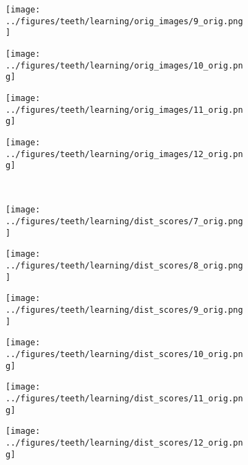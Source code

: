 \begin{figure}[h!]
\begin{subfigure}{0.16\textwidth}
		\label{fig:1}
	\end{subfigure}
	\begin{subfigure}{0.16\textwidth}
		\centering
		\texttt{[image: ../figures/teeth/learning/orig\_images/9\_orig.png]}
		\label{fig:1}
	\end{subfigure}
	\begin{subfigure}{0.16\textwidth}
		\centering
		\texttt{[image: ../figures/teeth/learning/orig\_images/10\_orig.png]}
		\label{fig:1}
	\end{subfigure}
	\begin{subfigure}{0.16\textwidth}
		\centering
		\texttt{[image: ../figures/teeth/learning/orig\_images/11\_orig.png]}
		\label{fig:1}
	\end{subfigure}
	\begin{subfigure}{0.16\textwidth}
		\centering
		\texttt{[image: ../figures/teeth/learning/orig\_images/12\_orig.png]}
		\label{fig:1}
	\end{subfigure}
	\vspace{-0.35cm}
	\\
	\begin{subfigure}{0.16\textwidth}
		\centering
		\texttt{[image: ../figures/teeth/learning/dist\_scores/7\_orig.png]}
		\label{fig:1}
	\end{subfigure}
	\begin{subfigure}{0.16\textwidth}
		\centering
		\texttt{[image: ../figures/teeth/learning/dist\_scores/8\_orig.png]}
		\label{fig:1}
	\end{subfigure}
	\begin{subfigure}{0.16\textwidth}
		\centering
		\texttt{[image: ../figures/teeth/learning/dist\_scores/9\_orig.png]}
		\label{fig:1}
	\end{subfigure}
	\begin{subfigure}{0.16\textwidth}
		\centering
		\texttt{[image: ../figures/teeth/learning/dist\_scores/10\_orig.png]}
		\label{fig:1}
	\end{subfigure}
	\begin{subfigure}{0.16\textwidth}
		\centering
		\texttt{[image: ../figures/teeth/learning/dist\_scores/11\_orig.png]}
		\label{fig:1}
	\end{subfigure}
	\begin{subfigure}{0.16\textwidth}
		\centering
		\texttt{[image: ../figures/teeth/learning/dist\_scores/12\_orig.png]}
		\label{fig:1}

\end{subfigure}
\end{figure}
